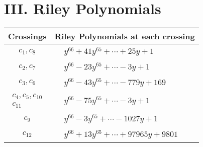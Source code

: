 \documentclass[1p]{elsarticle_modified}
\theoremstyle{definition}
\begin{document}
\centering \section*{ III. Riley Polynomials}
\begin{tabular}{m{50pt}|m{274pt}}
Crossings & \hspace{64pt}Riley Polynomials at each crossing \\
\hline $$\begin{aligned}c_{1},c_{8}\end{aligned}$$&$\begin{aligned}
&y^{66}+41 y^{65}+\cdots+25 y+1
\end{aligned}$\\
\hline $$\begin{aligned}c_{2},c_{7}\end{aligned}$$&$\begin{aligned}
&y^{66}-23 y^{65}+\cdots-3 y+1
\end{aligned}$\\
\hline $$\begin{aligned}c_{3},c_{6}\end{aligned}$$&$\begin{aligned}
&y^{66}-43 y^{65}+\cdots-779 y+169
\end{aligned}$\\
\hline $$\begin{aligned}c_{4},c_{5},c_{10}\\c_{11}\end{aligned}$$&$\begin{aligned}
&y^{66}-75 y^{65}+\cdots-3 y+1
\end{aligned}$\\
\hline $$\begin{aligned}c_{9}\end{aligned}$$&$\begin{aligned}
&y^{66}-3 y^{65}+\cdots-1027 y+1
\end{aligned}$\\
\hline $$\begin{aligned}c_{12}\end{aligned}$$&$\begin{aligned}
&y^{66}+13 y^{65}+\cdots+97965 y+9801
\end{aligned}$\\
\hline
\end{tabular}
\vskip 2pc
\end{document}
